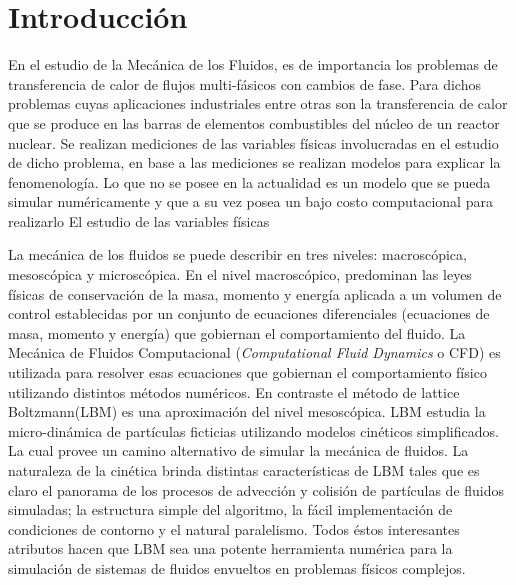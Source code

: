 \chapter{Introducción}
\graphicspath{{figs/cap1/}}
\label{cap1}


En el estudio de la Mecánica de los Fluidos, es de importancia los problemas de transferencia de calor de flujos multi-fásicos con cambios de fase. 
Para dichos problemas cuyas aplicaciones industriales entre otras son la transferencia de calor  que se produce en las barras de elementos combustibles del núcleo de un reactor nuclear.
Se realizan mediciones de las variables físicas involucradas en el estudio de dicho problema, en base a las mediciones se realizan modelos para explicar la fenomenología.
Lo que no se posee en la actualidad es un modelo que se pueda simular numéricamente y que a su vez posea un bajo costo computacional para realizarlo
El estudio de las variables físicas  

La mecánica de los fluidos se puede describir en tres niveles: macroscópica, mesoscópica y microscópica.
En el nivel macroscópico, predominan las leyes físicas de conservación de la masa, momento y energía aplicada a un volumen de control establecidas por un conjunto de ecuaciones diferenciales (ecuaciones de masa, momento y energía) que gobiernan el comportamiento del fluido. La Mecánica de Fluidos Computacional (\textit{Computational Fluid Dynamics} o CFD) es utilizada para resolver esas ecuaciones que gobiernan el comportamiento físico utilizando distintos métodos numéricos. En contraste el método de lattice Boltzmann(LBM) es una aproximación del nivel mesoscópica. LBM estudia la micro-dinámica de partículas ficticias utilizando modelos cinéticos simplificados. La cual provee un camino alternativo de simular la mecánica de fluidos. La naturaleza de la cinética brinda distintas características de LBM tales que es claro el panorama de los procesos de advección y colisión de partículas de fluidos simuladas; la estructura simple del algoritmo, la fácil implementación de condiciones de contorno y el natural paralelismo. Todos éstos interesantes atributos hacen que LBM sea una potente herramienta numérica para la simulación de sistemas de fluidos envueltos en problemas físicos complejos.

